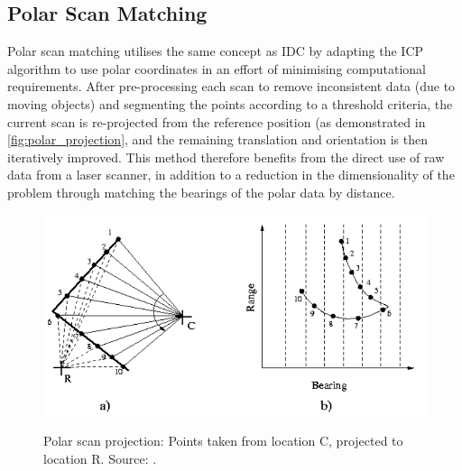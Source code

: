 \documentclass[authoryearcitations]{UoYCSproject}
\begin{document}
\subsection{Polar Scan Matching}
\label{subsec:psm}
Polar scan matching \citet{Diosi2005-nv} utilises the same concept as IDC by adapting the ICP algorithm to use polar coordinates in an effort of minimising computational requirements. After pre-processing each scan to remove inconsistent data (due to moving objects) and segmenting the points according to a threshold criteria, the current scan is re-projected from the reference position (as demonstrated in \autoref{fig:polar_projection}, and the remaining translation and orientation is then iteratively improved. This method therefore benefits from the direct use of raw data from a laser scanner, in addition to a reduction in the dimensionality of the problem through matching the bearings of the polar data by distance. 

\begin{figure}[t]
	\centering
	\includegraphics[width=\textwidth,keepaspectratio]{images/polar_projection.png}
	\label{fig:polar_projection}
	\caption{Polar scan projection: Points taken from location C, projected to location R. Source: \citet{Diosi2005-nv}.}
\end{figure}
\end{document}
